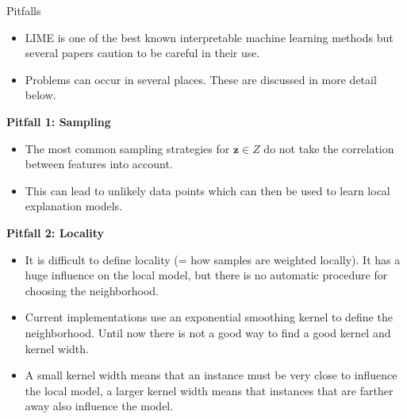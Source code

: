 \documentclass[11pt,compress,t,notes=noshow, xcolor=table]{beamer}
\newcommand{\zv}{\mathbf{z}}
\begin{document}
\begin{vbframe}{Pitfalls}
  \begin{itemize}
  	\item LIME is one of the best known interpretable machine learning methods but several papers caution to be careful in their use. 
  	\item Problems can occur in several places. These are discussed in more detail below. 
  \end{itemize}
	\textbf{Pitfall 1: Sampling}
	\begin{itemize}
	  \item The most common sampling strategies for $\zv \in Z$ do not take the correlation between features into account. 
      \item This can lead to unlikely data points which can then be used to learn local explanation models. 
    \end{itemize}
\framebreak
	\textbf{Pitfall 2: Locality}
	\begin{itemize} 
     \item It is difficult to define locality (= how samples are weighted locally). It has a huge influence on the local model, but there is no automatic procedure for choosing the neighborhood. 
     \item Current implementations use an exponential smoothing kernel to define the neighborhood. 
     Until now there is not a good way to find a good kernel and kernel width. 
     \item A small kernel width means that an instance must be very close to influence the local model, a larger kernel width means that instances that are farther away also influence the model. 
   \end{itemize}
\end{vbframe}
\end{document}
